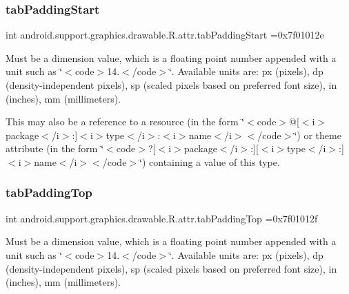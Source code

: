 \subsubsection{\texorpdfstring{tab\+Padding\+Start}{tabPaddingStart}}
{\footnotesize\ttfamily int android.\+support.\+graphics.\+drawable.\+R.\+attr.\+tab\+Padding\+Start =0x7f01012e\hspace{0.3cm}{\ttfamily [static]}}

Must be a dimension value, which is a floating point number appended with a unit such as \char`\"{}$<$code$>$14.\+5sp$<$/code$>$\char`\"{}. Available units are\+: px (pixels), dp (density-\/independent pixels), sp (scaled pixels based on preferred font size), in (inches), mm (millimeters). 

This may also be a reference to a resource (in the form \char`\"{}$<$code$>$@\mbox{[}$<$i$>$package$<$/i$>$\+:\mbox{]}$<$i$>$type$<$/i$>$\+:$<$i$>$name$<$/i$>$$<$/code$>$\char`\"{}) or theme attribute (in the form \char`\"{}$<$code$>$?\mbox{[}$<$i$>$package$<$/i$>$\+:\mbox{]}\mbox{[}$<$i$>$type$<$/i$>$\+:\mbox{]}$<$i$>$name$<$/i$>$$<$/code$>$\char`\"{}) containing a value of this type. \mbox{\label{classandroid_1_1support_1_1graphics_1_1drawable_1_1R_1_1attr_a50ac48b69c90f6ea0001c1bfb5dfcdbf}} 
\subsubsection{\texorpdfstring{tab\+Padding\+Top}{tabPaddingTop}}
{\footnotesize\ttfamily int android.\+support.\+graphics.\+drawable.\+R.\+attr.\+tab\+Padding\+Top =0x7f01012f\hspace{0.3cm}{\ttfamily [static]}}

Must be a dimension value, which is a floating point number appended with a unit such as \char`\"{}$<$code$>$14.\+5sp$<$/code$>$\char`\"{}. Available units are\+: px (pixels), dp (density-\/independent pixels), sp (scaled pixels based on preferred font size), in (inches), mm (millimeters). 

